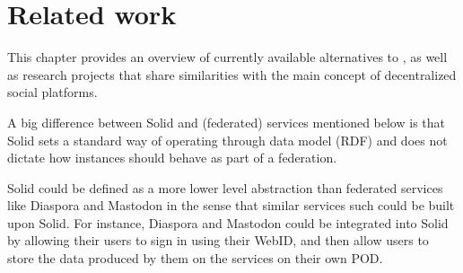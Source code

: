 \chapter{Related work}
\label{chap:num_2}

This chapter provides an overview of currently available alternatives to \solid{}, as well as research projects that share similarities with the main concept of decentralized social platforms.

A big difference between Solid and (federated) services mentioned below is that Solid sets a standard way of operating through data model (RDF) and does not dictate how instances should behave as part of a federation.

Solid could be defined as a more lower level abstraction than federated services like Diaspora and Mastodon in the sense that similar services such could be built upon Solid. For instance, Diaspora and Mastodon could be integrated into Solid by allowing their users to sign in using their WebID, and then allow users to store the data produced by them on the services on their own POD. 

